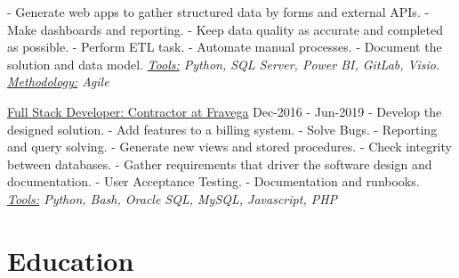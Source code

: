 \documentclass[letterpaper]{twentysecondcv} %
\begin{document}
    \newline
    \newline- Generate web apps to gather structured data by forms and external APIs.
    \newline- Make dashboards and reporting.
    \newline- Keep data quality as accurate and completed as possible.
    \newline- Perform ETL task.
    \newline- Automate manual processes.
    \newline- Document the solution and data model.
    \newline\newline\textit{\underline{Tools:} Python, SQL Server, Power BI, GitLab, Visio. \underline{Methodology:} Agile}
    \newline
    
{\large\underline{Full Stack Developer: Contractor at Fravega}} \hspace*{5pt} Dec-2016 - Jun-2019
    \newline
    \newline- Develop the designed solution.
    \newline- Add features to a billing system.
    \newline- Solve Bugs.
    \newline- Reporting and query solving.
    \newline- Generate new views and stored procedures.
    \newline- Check integrity between databases.
    \newline- Gather requirements that driver the software design and documentation.
    \newline- User Acceptance Testing.
    \newline- Documentation and runbooks.
    \newline\newline\textit{\underline{Tools:} Python, Bash, Oracle SQL, MySQL, Javascript, PHP}
    \newline


\section{Education}
\end{document}

